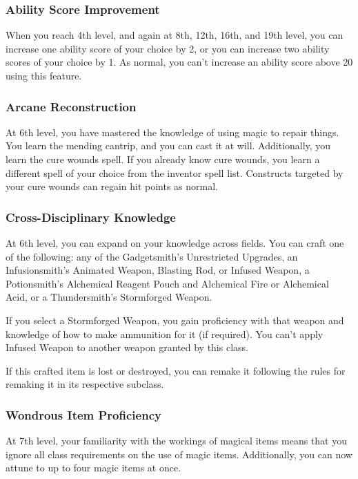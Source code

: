 \documentclass[11pt,twoside,openany]{book}  %
\begin{document}
\subsubsection{Ability Score Improvement}

When you reach 4th level, and again at 8th, 12th, 16th, and 19th level, you can increase one ability score of your choice by 2, or you can increase two ability scores of your choice by 1. As normal, you can’t increase an ability score above 20 using this feature.

\subsubsection{Arcane Reconstruction}

At 6th level, you have mastered the knowledge of using magic to repair things. You learn the mending cantrip, and you can cast it at will. Additionally, you learn the cure wounds spell. If you already know cure wounds, you learn a different spell of your choice from the inventor spell list. Constructs targeted by your cure wounds can regain hit points as normal.

\subsubsection{Cross-Disciplinary Knowledge}

At 6th level, you can expand on your knowledge across fields. You can craft one of the following: any of the Gadgetsmith’s Unrestricted Upgrades, an Infusionsmith’s Animated Weapon, Blasting Rod, or Infused Weapon, a Potionsmith’s Alchemical Reagent Pouch and Alchemical Fire or Alchemical Acid, or a Thundersmith’s Stormforged Weapon.

If you select a Stormforged Weapon, you gain proficiency with that weapon and knowledge of how to make ammunition for it (if required). You can’t apply Infused Weapon to another weapon granted by this class.

If this crafted item is lost or destroyed, you can remake it following the rules for remaking it in its respective subclass.

\subsubsection{Wondrous Item Proficiency}

At 7th level, your familiarity with the workings of magical items means that you ignore all class requirements on the use of magic items. Additionally, you can now attune to up to four magic items at once.
\end{document}
